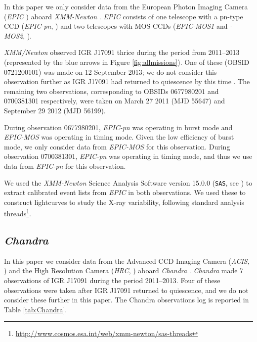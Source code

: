 \par In this paper we only consider data from the European Photon Imaging Camera (\textit{EPIC} \citealp{Bignami_EPIC}) aboard \textit{XMM-Newton} \citep{Jansen_XMM}.   \textit{EPIC} consists of one telescope with a pn-type CCD (\textit{EPIC-pn}, \citealp{Struder_PN}) and two telescopes with MOS CCDs (\textit{EPIC-MOS1} and \textit{-MOS2}, \citealp{Turner_MOS}).
\par \textit{XMM/Newton} observed IGR J17091 thrice during the period from 2011--2013 (represented by the blue arrows in Figure \ref{fig:allmissions}).  One of these (OBSID 0721200101) was made on 12 September 2013; we do not consider this observation further as IGR J17091 had returned to quiescence by this time \citep{Altamirano_Quiescence}.  The remaining two observations, corresponding to OBSIDs 0677980201 and 0700381301 respectively, were taken on March 27 2011 (MJD 55647) and September 29 2012 (MJD 56199).
\par During observation 0677980201, \textit{EPIC-pn} was operating in burst mode and \textit{EPIC-MOS} was operating in timing mode.  Given the low efficiency of burst mode, we only consider data from \textit{EPIC-MOS} for this observation.  During observation 0700381301, \textit{EPIC-pn} was operating in timing mode, and thus we use data from \textit{EPIC-pn} for this observation.
\par We used the \textit{XMM-Newton} Science Analysis Software version 15.0.0 (\texttt{SAS}, see \citealp{Ibarra_sas}) to extract calibrated event lists from \textit{EPIC} in both observations.  We used these to construct lightcurves to study the X-ray variability, following standard analysis threads\footnote{\url{http://www.cosmos.esa.int/web/xmm-newton/sas-threads}}.

\subsection{\textit{Chandra}}

\par In this paper we consider data from the Advanced CCD Imaging Camera (\textit{ACIS}, \citealp{Nousek_ACIS}) and the High Resolution Camera (\textit{HRC}, \citealp{Murray_HRC}) aboard \textit{Chandra} \citep{Weisskopf_Chandra}.  \textit{Chandra} made 7 observations of IGR J17091 during the period 2011--2013.  Four of these observations were taken after IGR J17091 returned to quiescence, and we do not consider these further in this paper.  The Chandra observations log is reported in Table \ref{tab:Chandra}. 

